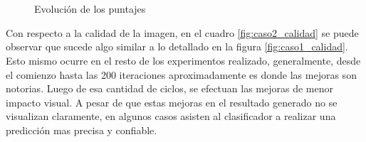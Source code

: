 \documentclass[a4paper,11pt,spanish]{book}
\begin{document}
      \begin{figure}[H]
	\begin{center}
	  \\
	  \\
	\end{center}
	\caption{Evolución de los puntajes}
	\label{fig:puntajes_caso2}
      \end{figure}
      
      Con respecto a la calidad de la imagen, en el cuadro \ref{fig:caso2_calidad} se puede observar que sucede algo similar a lo detallado en la figura \ref{fig:caso1_calidad}.
      Esto mismo ocurre en el resto de los experimentos realizado, generalmente, desde el comienzo hasta las 200 iteraciones aproximadamente es donde las mejoras son notorias. 
      Luego de esa cantidad de ciclos, se efectuan las mejoras de menor impacto visual. A pesar de que estas mejoras en el resultado generado no se visualizan claramente,
      en algunos casos asisten al clasificador a realizar una predicción mas precisa y confiable.
      
\end{document}
